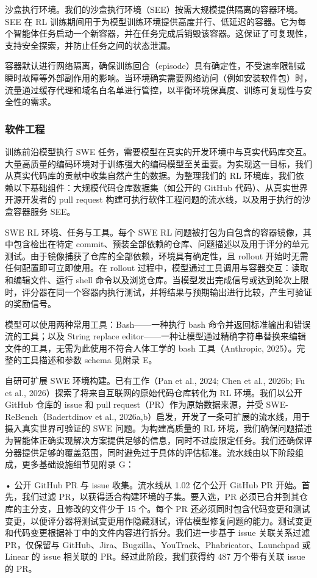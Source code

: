 \documentclass[
  10
]{article}
\begin{document}
沙盒执行环境。我们的沙盒执行环境（SEE）按需大规模提供隔离的容器环境。SEE 在 RL 训练期间用于为模型训练环境提供高度并行、低延迟的容器。它为每个智能体任务启动一个新容器，并在任务完成后销毁该容器。这保证了可复现性，支持安全探索，并防止任务之间的状态泄漏。

容器默认进行网络隔离，确保训练回合（episode）具有确定性，不受速率限制或瞬时故障等外部副作用的影响。当环境确实需要网络访问（例如安装软件包）时，流量通过缓存代理和域名白名单进行管控，以平衡环境保真度、训练可复现性与安全性的需求。

\subsubsection{软件工程}\label{software-engineering}

训练前沿模型执行 SWE 任务，需要模型在真实的开发环境中与真实代码库交互。大量高质量的编码环境对于训练强大的编码模型至关重要。为实现这一目标，我们从真实代码库的贡献中收集自然产生的数据。为整理我们的 RL 环境库，我们依赖以下基础组件：大规模代码仓库数据集（如公开的 GitHub 代码）、从真实世界开源开发者的 pull request 构建可执行软件工程问题的流水线，以及用于执行的沙盒容器服务 SEE。

SWE RL 环境、任务与工具。每个 SWE RL 问题被打包为自包含的容器镜像，其中包含检出在特定 commit、预装全部依赖的仓库、问题描述以及用于评分的单元测试。由于镜像捕获了仓库的全部依赖，环境具有确定性，且 rollout 开始时无需任何配置即可立即使用。在 rollout 过程中，模型通过工具调用与容器交互：读取和编辑文件、运行 shell 命令以及浏览仓库。当模型发出完成信号或达到轮次上限时，评分器在同一个容器内执行测试，并将结果与预期输出进行比较，产生可验证的奖励信号。

模型可以使用两种常用工具：Bash——一种执行 bash 命令并返回标准输出和错误流的工具；以及 String replace editor——一种让模型通过精确字符串替换来编辑文件的工具，无需为此使用不符合人体工学的 bash 工具（Anthropic, 2025）。完整的工具描述和参数 schema 见附录 E。

自研可扩展 SWE 环境构建。已有工作（Pan et al., 2024; Chen et al., 2026b; Fu et al., 2026）探索了将来自互联网的原始代码仓库转化为 RL 环境。我们以公开 GitHub 仓库的 issue 和 pull request（PR）作为原始数据来源，并受 SWE-ReBench（Badertdinov et al., 2026a,b）启发，开发了一条可扩展的流水线，用于摄入真实世界可验证的 SWE 问题。为构建高质量的 RL 环境，我们确保问题描述为智能体正确实现解决方案提供足够的信息，同时不过度限定任务。我们还确保评分器提供足够的覆盖范围，同时避免过于具体的评估标准。流水线由以下阶段组成，更多基础设施细节见附录 G：

• 公开 GitHub PR 与 issue 收集。流水线从 1.02 亿个公开 GitHub PR 开始。首先，我们过滤 PR，以获得适合构建环境的子集。要入选，PR 必须已合并到其仓库的主分支，且修改的文件少于 15 个。每个 PR 还必须同时包含代码变更和测试变更，以便评分器将测试变更用作隐藏测试，评估模型修复问题的能力。测试变更和代码变更根据补丁中的文件内容进行拆分。我们进一步基于 issue 关联关系过滤 PR，仅保留与 GitHub、Jira、Bugzilla、YouTrack、Phabricator、Launchpad 或 Linear 的 issue 相关联的 PR。经过此阶段，我们获得约 487 万个带有关联 issue 的 PR。
\end{document}
